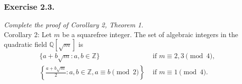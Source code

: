 \documentclass{article}
\begin{document}



\subsubsection*{Exercise 2.3.}
\emph{Complete the proof of Corollary 2, Theorem 1.} \\

Corollary 2: Let $m$ be a squarefree integer.
The set of algebraic integers in the quadratic field $\mathbb{Q}[\sqrt{m}]$ is
\begin{align*}
    \{a + b\sqrt{m} : a, b \in \mathbb{Z} \}
        & \text{ if $m \equiv 2, 3 \pmod 4$,} \\
    \left\{ \frac{a+b\sqrt{m}}{2} : a, b \in \mathbb{Z}, a \equiv b \pmod 2\right\}
        & \text{ if $m \equiv 1 \pmod 4$.} \\
\end{align*}
\end{document}
